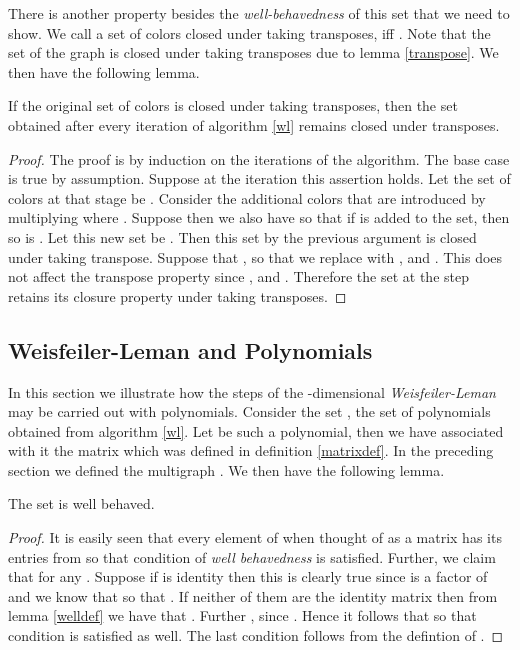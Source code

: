 There is another property besides the \emph{well-behavedness} of this set that we need to show. We call a set of colors  closed under taking transposes, iff .
Note that the set  of the graph  is closed under taking transposes due to lemma \ref{transpose}. We then have the following lemma.

\begin{lemma}\label{transposepol}
	If the original set of colors  is closed under taking transposes, then the set  obtained after every iteration of algorithm \ref{wl} remains closed under transposes.
\end{lemma}

\begin{proof}
	The proof is by induction on the iterations of the algorithm. The base case is true by assumption. Suppose at the  iteration this assertion holds. Let the set of colors at that stage be 
	. Consider the additional colors  that are introduced by multiplying  where . Suppose 
	 then we also have  so that if  is added to the set, then so is . Let this new set be . Then this set by the previous
	argument is closed under taking transpose. Suppose that , so that we replace  with ,  and .
	This does not affect the transpose property
	since ,  and . Therefore the set at the  step retains
	its closure property under taking transposes.
\end{proof}

\subsection{Weisfeiler-Leman and Polynomials}
	In this section we illustrate how the steps of the -dimensional \emph{Weisfeiler-Leman} may be carried out with polynomials. Consider the set , the set of polynomials  obtained
	from algorithm \ref{wl}. Let  be such a polynomial, then we have associated with it the matrix  which was defined in definition \ref{matrixdef}.
        In the preceding section we defined the multigraph . We then have the following lemma.

	\begin{lemma}
		The set  is well behaved.
	\end{lemma}


	\begin{proof}
		It is easily seen that every element of  when thought of as a matrix has its entries from  so that condition  of \emph{well behavedness} is satisfied. Further, we claim that for 
		any . Suppose if  is identity then this is clearly true since  is a factor of  and we know that  so that
		. If neither of them are the
		identity matrix then from lemma \ref{welldef} we have that . Further , since 
		. Hence it follows that  so that condition  is satisfied as well. The last condition follows from the defintion of .
	\end{proof}


